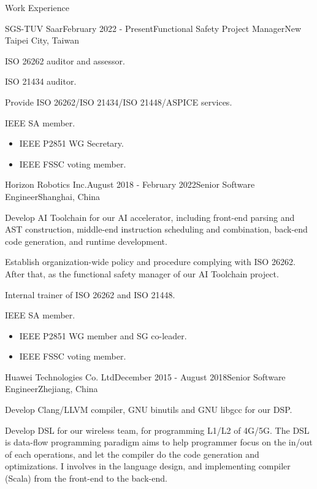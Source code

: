 \documentclass{resume} %
\begin{document}
\begin{rSection}{Work Experience}

\begin{rSubsection}{SGS-TUV Saar}{February 2022 - Present}{Functional Safety Project Manager}{New Taipei City, Taiwan}
\item ISO 26262 auditor and assessor.
\item ISO 21434 auditor.
\item Provide ISO 26262/ISO 21434/ISO 21448/ASPICE services.
\item IEEE SA member.
\begin{itemize}
\item IEEE P2851 WG Secretary.
\item IEEE FSSC voting member.
\end{itemize}
\end{rSubsection}

\begin{rSubsection}{Horizon Robotics Inc.}{August 2018 - February 2022}{Senior Software Engineer}{Shanghai, China}
\item Develop AI Toolchain for our AI accelerator, including front-end parsing and AST construction, middle-end instruction scheduling and combination, back-end code generation, and runtime development. 
\item Establish organization-wide policy and procedure complying with ISO 26262. After that, as the functional safety manager of our AI Toolchain project.
\item Internal trainer of ISO 26262 and ISO 21448.
\item IEEE SA member.
\begin{itemize}
\item IEEE P2851 WG member and SG co-leader.
\item IEEE FSSC voting member.
\end{itemize}
\end{rSubsection}


\begin{rSubsection}{Huawei Technologies Co. Ltd}{December 2015 - August 2018}{Senior Software Engineer}{Zhejiang, China}
\item Develop Clang/LLVM compiler, GNU binutils and GNU libgcc for our DSP.
\item Develop DSL for our wireless team, for programming L1/L2 of 4G/5G. The DSL is data-flow programming paradigm aims to help programmer focus on the in/out of each operations, and let the compiler do the code generation and optimizations. I involves in the language design, and implementing compiler (Scala) from the front-end to the back-end.
\end{rSubsection}


\end{rSection}
\end{document}
